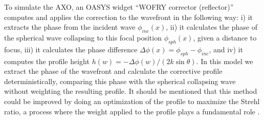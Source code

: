 \documentclass{iucr}
\begin{document}
To simulate the AXO, an OASYS widget ``WOFRY corrector (reflector)'' computes and applies the correction to the wavefront in the following way: i) it extracts the phase from the incident wave $\phi_{inc}(x)$, ii)  it calculates the phase of the spherical wave collapsing to this focal position $\phi_{sph}(x)$, given a distance to focus, %
iii) it calculates the phase difference $\Delta \phi(x) = \phi_{sph} - \phi_{inc}$, and iv) it computes the profile height $h(w) = -\Delta \phi(w) / (2 k \sin \theta)$. In this model we extract the phase of the wavefront and calculate the corrective profile deterministically, comparing this phase with the spherical collapsing wave without weighting the resulting profile. It should be mentioned that this method could be improved by doing an optimization of the profile to maximize the Strehl ratio, a process where the weight applied to the profile plays a fundamental role \cite{Goldberg2016}.
\end{document}

